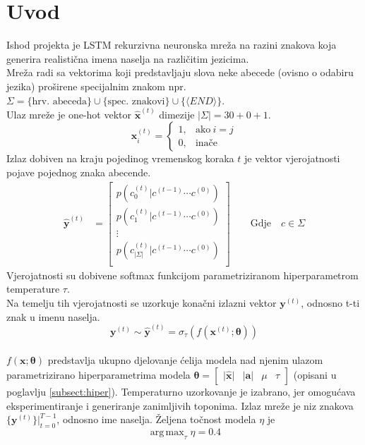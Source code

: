 \documentclass[conference]{IEEEtran}
\DeclareMathOperator*{\argmax}{arg\,max}
\begin{document}
\section{Uvod}
\label{sect:intro}
Ishod projekta je LSTM rekurzivna neuronska mreža na razini znakova koja generira realistična imena naselja na različitim jezicima.\\
Mreža radi sa vektorima koji predstavljaju slova neke abecede (ovisno o odabiru jezika) proširene specijalnim znakom npr. $\Sigma = \{ \text{hrv. abeceda}\} \cup \{ \text{spec. znakovi}\} \cup \{\langle END \rangle\}$.\\
Ulaz mreže je one-hot vektor $\mathbf{\hat{x}}^{(t)}$ dimezije $\lvert \Sigma \rvert = 30 + 0 + 1$.
\begin{equation}
\mathbf{x}^{(t)}_i=
    \begin{cases}
      1, & \text{ako}\ i=j \\
      0, & \text{inače}
    \end{cases}
\end{equation}
Izlaz dobiven na kraju pojedinog vremenskog koraka $t$ je vektor vjerojatnosti pojave pojednog znaka abecende.\\
\begin{align}
    \hat{\mathbf{y}}^{(t)} &= \begin{bmatrix}
           p(c_0^{(t)} | c^{(t-1)} \cdots c^{(0)} ) \\
           p(c_1^{(t)} | c^{(t-1)} \cdots c^{(0)} ) \\
           \vdots \\
           p(c_{\lvert \Sigma \rvert}^{(t)} | c^{(t-1)} \cdots c^{(0)} ) \\
         \end{bmatrix}
         \quad \quad \text{Gdje} \quad c \in \Sigma
\end{align}
Vjerojatnosti su dobivene softmax funkcijom parametriziranom hiperparametrom temperature $\tau$.\\
Na temelju tih vjerojatnosti se uzorkuje konačni izlazni vektor $\mathbf{y}^{(t)}$, odnosno t-ti znak u imenu naselja.\\
\begin{equation}
 \mathbf{y}^{(t)} \sim \hat{\mathbf{y}}^{(t)} = \sigma_{\tau}(f(\mathbf{x}^{(t)} ; \boldsymbol{\theta}))
\end{equation}
\ \\
$f(\mathbf{x} ; \boldsymbol{\theta})$ predstavlja ukupno djelovanje ćelija modela nad njenim ulazom parametrizirano hiperparametrima modela $\boldsymbol{\theta} = \begin{bmatrix} \lvert \mathbf{\hat{x}} \rvert & \lvert \mathbf{a} \rvert & \mu & \tau \end{bmatrix}$ (opisani u poglavlju \ref{subsect:hiper}).
Temperaturno uzorkovanje je izabrano, jer omogućava eksperimentiranje i generiranje zanimljivih toponima.
Izlaz mreže je niz znakova $\{\mathbf{y}^{(t)}\} \biggr \rvert_{t=0}^{T-1}$, odnosno ime naselja.
Željena točnost modela $\eta$ je \[\argmax_{\tau} \eta = 0.4\]
\end{document}
